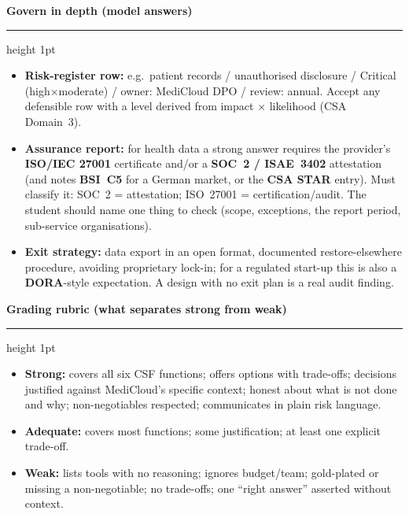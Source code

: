 \documentclass[11pt]{article}
\newcommand{\wbsection}[1]{\par\vspace{11pt}\noindent
  {\large\bfseries\color{kred}#1}\par\vspace{2pt}
  {\color{kred!35}\hrule height 1pt}\par\vspace{6pt}}
\renewcommand{\emph}[1]{\textup{#1}}
\begin{document}
\wbsection{Govern in depth (model answers)}
\begin{itemize}
\item \textbf{Risk-register row:} e.g.\ \emph{patient records / unauthorised disclosure / Critical
      (high$\times$moderate) / owner: MediCloud DPO / review: annual}. Accept any defensible row with a
      level derived from impact $\times$ likelihood (CSA Domain~3).
\item \textbf{Assurance report:} for health data a strong answer requires the provider's \textbf{ISO/IEC
      27001} certificate \emph{and/or} a \textbf{SOC~2 / ISAE~3402} attestation (and notes \textbf{BSI~C5}
      for a German market, or the \textbf{CSA STAR} entry). Must classify it: SOC~2 = attestation; ISO~27001
      = certification/audit. The student should name one thing to check (scope, exceptions, the report
      period, sub-service organisations).
\item \textbf{Exit strategy:} data export in an open format, documented restore-elsewhere procedure,
      avoiding proprietary lock-in; for a regulated start-up this is also a \textbf{DORA}-style expectation.
      A design with no exit plan is a real audit finding.
\end{itemize}

\wbsection{Grading rubric (what separates strong from weak)}
\begin{itemize}
\item \textbf{Strong:} covers all six CSF functions; offers options with trade-offs; decisions justified
      against MediCloud's specific context; honest about what is \emph{not} done and why; non-negotiables
      respected; communicates in plain risk language.
\item \textbf{Adequate:} covers most functions; some justification; at least one explicit trade-off.
\item \textbf{Weak:} lists tools with no reasoning; ignores budget/team; gold-plated or missing a
      non-negotiable; no trade-offs; one ``right answer'' asserted without context.
\end{itemize}
\end{document}
